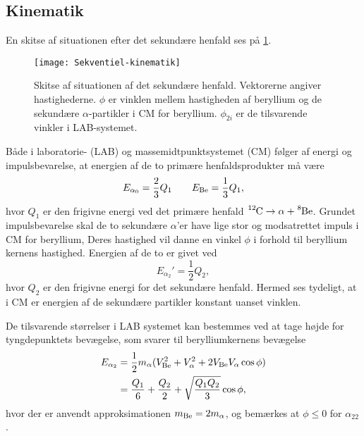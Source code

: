 \subsection{Kinematik}
\label{sec:sekv-kinematik}

En skitse af situationen efter det sekundære henfald ses på \cref{fig:secundary}.
\begin{figure}[h]
  \centering
  \texttt{[image: Sekventiel-kinematik]}
  \caption{Skitse af situationen af det sekundære henfald. Vektorerne angiver hastighederne. $\phi$ er
    vinklen mellem hastigheden af beryllium og de sekundære $\alpha$-partikler i CM for beryllium. $\phi_{2i}$ er
    de tilsvarende vinkler i LAB-systemet.}
  \label{fig:secundary}
\end{figure}

Både i laboratorie- (LAB) og massemidtpunktsystemet (CM) følger af energi og impulsbevarelse,
at energien af de to primære henfaldsprodukter må være
\begin{equation}
  \label{eq:Ealpha0}
  E_{\alpha_{0}} = \frac{2}{3} Q_{1} \qquad E_{\ce{Be}} = \frac{1}{3} Q_{1},
\end{equation}
hvor $Q_{1}$ er den frigivne energi ved det primære henfald $\Carb \rightarrow \alpha + \Be$. Grundet
impulsbevarelse skal de to sekundære $\alpha$'er have lige stor og modsatrettet impuls i CM for
beryllium, Deres hastighed vil danne en vinkel $\phi$ i forhold til beryllium kernens
hastighed. Energien af de to er givet ved
\begin{equation}
  \label{eq:Ealpha2}
  E_{\alpha_{2}}' = \frac{1}{2} Q_{2},
\end{equation}
hvor $Q_{2}$ er den frigivne energi for det sekundære henfald. Hermed ses tydeligt, at i CM er
energien af de sekundære partikler konstant uanset vinklen.

De tilsvarende størrelser i LAB systemet kan bestemmes ved at tage højde for tyngdepunktets
bevægelse, som svarer til berylliumkernens bevægelse
\begin{align}
  E_{\alpha_{2}} %
  &= \frac{1}{2}m_{\alpha} (V_{\ce{Be}}^{2} + V_{\alpha}^{2} + 2V_{\ce{Be}}V_{\alpha} \cos \phi) \notag \\
  &= \frac{Q_{1}}{6} + \frac{Q_{2}}{2} + \sqrt{\frac{Q_{1}Q_{2}}{3}} \cos \phi,           
  \label{eq:E2LAB} 
\end{align}
hvor der er anvendt approksimationen $m_{\ce{Be}} = 2m_{\alpha}$, og bemærkes at $\phi \leq 0$ for $\alpha_{22}$. 


